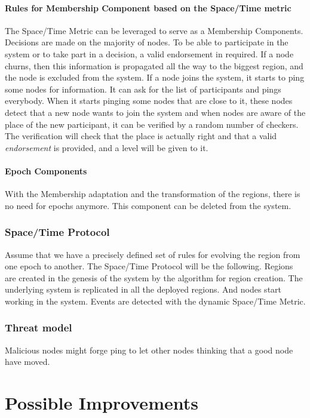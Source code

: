 \documentclass[a4paper,11pt,oneside]{report}
\begin{document}
\subsubsection{Rules for Membership Component based on the Space/Time metric}
The Space/Time Metric can be leveraged to serve as a Membership Components.
Decisions are made on the majority of nodes. To be able to participate in
the system or to take part in a decision, a valid endorsement in required. If a
node churns, then this information is propagated all the way to the
biggest region, and the node is excluded from the system.  If a node joins the
system, it starts to ping some nodes for information. It can ask for the list
of participants and pings everybody. When it starts pinging some nodes that are
close to it, these nodes detect that a new node wants to join the system and
when nodes are aware of the place of the new participant, it can be verified by
a random number of checkers. The verification will check that the place is
actually right and that a valid \textit{endorsement} is provided, and a level
will be given to it. 

\subsubsection{Epoch Components}
With the Membership adaptation and the transformation of the regions, there is
no need for epochs anymore. This component can be deleted from the system. 

\subsection{Space/Time Protocol}
Assume that we have a precisely defined set of rules for evolving the region
from one epoch to another.  The Space/Time Protocol will be the following.
Regions are created in the genesis of the system by the algorithm for region
creation. The underlying system is replicated in all the deployed regions. And
nodes start working in the system. Events are detected with the dynamic
Space/Time Metric. 

\subsection{Threat model}
Malicious nodes might forge ping to let other nodes thinking that a good node have moved. 


\chapter{Possible Improvements}
\end{document}
